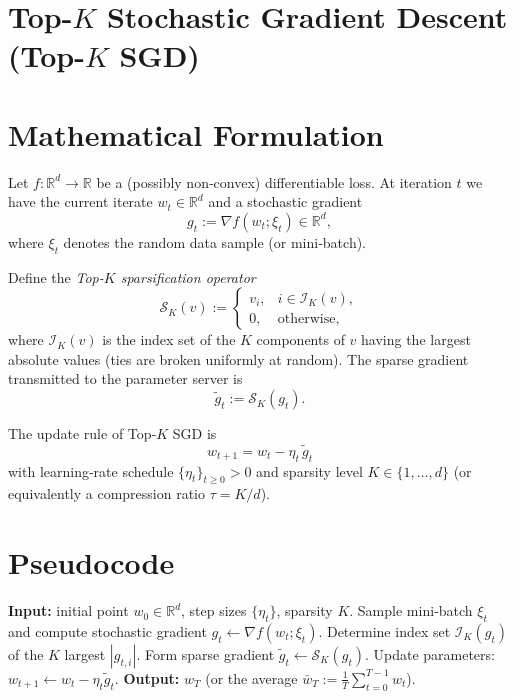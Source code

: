 \documentclass{article}
\newcommand{\R}{\mathbb{R}}
\begin{document}
\section*{Top-$K$ Stochastic Gradient Descent (Top-$K$ SGD)}

\section*{Mathematical Formulation}
Let $f:\R^{d}\rightarrow\R$ be a (possibly non‑convex) differentiable loss.  
At iteration $t$ we have the current iterate $w_{t}\in\R^{d}$ and a stochastic gradient
\[
g_{t}:=\nabla f(w_{t};\xi_{t})\in\R^{d},
\]
where $\xi_{t}$ denotes the random data sample (or mini‑batch).  

Define the \emph{Top-$K$ sparsification operator}
\[
\mathcal{S}_{K}(v):=\left\{
\begin{array}{ll}
v_{i}, & i\in\mathcal{I}_{K}(v),\\[2mm]
0, & \text{otherwise},
\end{array}\right.
\]
where $\mathcal{I}_{K}(v)$ is the index set of the $K$ components of $v$ having the largest absolute values (ties are broken uniformly at random).  
The sparse gradient transmitted to the parameter server is
\[
\tilde g_{t}:=\mathcal{S}_{K}(g_{t}) .
\]

The update rule of Top‑$K$ SGD is
\[
\boxed{\,w_{t+1}=w_{t}-\eta_{t}\,\tilde g_{t}\,} \tag{1}
\]
with learning‑rate schedule $\{\eta_{t}\}_{t\ge 0}>0$ and sparsity level $K\in\{1,\dots ,d\}$ (or equivalently a compression ratio $\tau=K/d$).

\section*{Pseudocode}
\begin{algorithm}[H]
\caption{Top-$K$ SGD}
\begin{algorithmic}[1]
\State \textbf{Input:} initial point $w_{0}\in\R^{d}$, step sizes $\{\eta_{t}\}$, sparsity $K$.
    \State Sample mini‑batch $\xi_{t}$ and compute stochastic gradient $g_{t}\gets\nabla f(w_{t};\xi_{t})$.
    \State Determine index set $\mathcal{I}_{K}(g_{t})$ of the $K$ largest $|g_{t,i}|$.
    \State Form sparse gradient $\tilde g_{t}\gets\mathcal{S}_{K}(g_{t})$.
    \State Update parameters: $w_{t+1}\gets w_{t}-\eta_{t}\tilde g_{t}$.
\EndFor
\State \textbf{Output:} $w_{T}$ (or the average $\bar w_{T}:=\tfrac1T\sum_{t=0}^{T-1}w_{t}$).
\end{algorithmic}
\end{algorithm}
\end{document}
